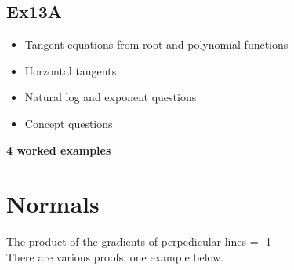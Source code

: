 \documentclass[11pt]{report}
\begin{document}
\newpage
\subsection{Ex13A}
\begin{itemize}
	\item Tangent equations from root and polynomial functions
	\item Horzontal tangents
	\item Natural log and exponent questions
	\item Concept questions 
\end{itemize}

\textbf{4 worked examples} 
\newpage
 
\newpage
\section{Normals}
\newcommand{\ang}{50}
\newcommand{\ext}{5}
The product of the gradients of perpedicular lines = -1\\
There are various proofs, one example below.\\
\end{document}
